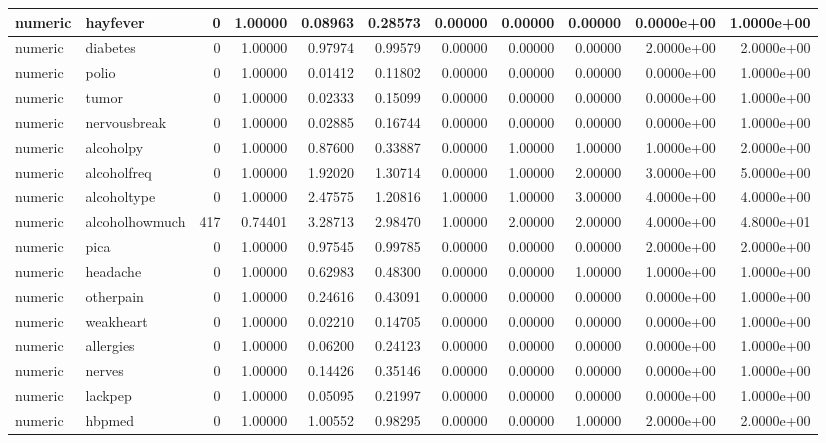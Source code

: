 \documentclass[12pt, krantz2,]{book}
\theoremstyle{definition}
\theoremstyle{definition}
\theoremstyle{definition}
\newcommand{\1}{\mathbbm{1}}
\begin{document}
\begin{tabular}{l|l|r|r|r|r|r|r|r|r|r}
\hline
numeric & hayfever & 0 & 1.00000 & 0.08963 & 0.28573 & 0.00000 & 0.00000 & 0.00000 & 0.0000e+00 & 1.0000e+00\\
\hline
numeric & diabetes & 0 & 1.00000 & 0.97974 & 0.99579 & 0.00000 & 0.00000 & 0.00000 & 2.0000e+00 & 2.0000e+00\\
\hline
numeric & polio & 0 & 1.00000 & 0.01412 & 0.11802 & 0.00000 & 0.00000 & 0.00000 & 0.0000e+00 & 1.0000e+00\\
\hline
numeric & tumor & 0 & 1.00000 & 0.02333 & 0.15099 & 0.00000 & 0.00000 & 0.00000 & 0.0000e+00 & 1.0000e+00\\
\hline
numeric & nervousbreak & 0 & 1.00000 & 0.02885 & 0.16744 & 0.00000 & 0.00000 & 0.00000 & 0.0000e+00 & 1.0000e+00\\
\hline
numeric & alcoholpy & 0 & 1.00000 & 0.87600 & 0.33887 & 0.00000 & 1.00000 & 1.00000 & 1.0000e+00 & 2.0000e+00\\
\hline
numeric & alcoholfreq & 0 & 1.00000 & 1.92020 & 1.30714 & 0.00000 & 1.00000 & 2.00000 & 3.0000e+00 & 5.0000e+00\\
\hline
numeric & alcoholtype & 0 & 1.00000 & 2.47575 & 1.20816 & 1.00000 & 1.00000 & 3.00000 & 4.0000e+00 & 4.0000e+00\\
\hline
numeric & alcoholhowmuch & 417 & 0.74401 & 3.28713 & 2.98470 & 1.00000 & 2.00000 & 2.00000 & 4.0000e+00 & 4.8000e+01\\
\hline
numeric & pica & 0 & 1.00000 & 0.97545 & 0.99785 & 0.00000 & 0.00000 & 0.00000 & 2.0000e+00 & 2.0000e+00\\
\hline
numeric & headache & 0 & 1.00000 & 0.62983 & 0.48300 & 0.00000 & 0.00000 & 1.00000 & 1.0000e+00 & 1.0000e+00\\
\hline
numeric & otherpain & 0 & 1.00000 & 0.24616 & 0.43091 & 0.00000 & 0.00000 & 0.00000 & 0.0000e+00 & 1.0000e+00\\
\hline
numeric & weakheart & 0 & 1.00000 & 0.02210 & 0.14705 & 0.00000 & 0.00000 & 0.00000 & 0.0000e+00 & 1.0000e+00\\
\hline
numeric & allergies & 0 & 1.00000 & 0.06200 & 0.24123 & 0.00000 & 0.00000 & 0.00000 & 0.0000e+00 & 1.0000e+00\\
\hline
numeric & nerves & 0 & 1.00000 & 0.14426 & 0.35146 & 0.00000 & 0.00000 & 0.00000 & 0.0000e+00 & 1.0000e+00\\
\hline
numeric & lackpep & 0 & 1.00000 & 0.05095 & 0.21997 & 0.00000 & 0.00000 & 0.00000 & 0.0000e+00 & 1.0000e+00\\
\hline
numeric & hbpmed & 0 & 1.00000 & 1.00552 & 0.98295 & 0.00000 & 0.00000 & 1.00000 & 2.0000e+00 & 2.0000e+00\\

\end{tabular}
\end{document}
